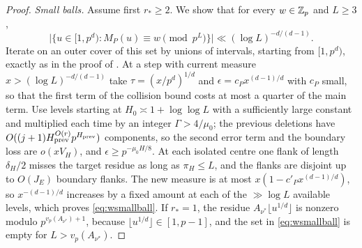 \documentclass[11pt]{article}
\begin{document}
\begin{proof}
\emph{Small balls.} Assume first $r_*\ge2$. We show that for every $w\in\mathbb Z_p$ and $L\ge3$,
\begin{equation}\label{eq:wsmallball}
\bigl|\{u\in[1,p^d):M_P(u)\equiv w\pmod{p^L}\}\bigr|\ll(\log L)^{-d/(d-1)} .
\end{equation}
Iterate  on an outer cover of this set by unions of intervals, starting from $[1,p^d)$, exactly as in
the proof of . At a step with current measure $x>(\log L)^{-d/(d-1)}$ take
$\tau=(x/p^d)^{1/d}$ and $\epsilon=c_Px^{(d-1)/d}$ with $c_P$ small, so that the first term of the collision bound
costs at most a quarter of the main term. Use levels starting at $H_0\asymp1+\log\log L$ with a sufficiently large
constant and multiplied each time by an integer $\Gamma>4/\mu_0$; the previous deletions have
$O((j+1)H_{\rm prev}^{O(r)}p^{H_{\rm prev}})$ components, so the second error term and the boundary loss are $o(xV_H)$, and
$\epsilon\ge p^{-\mu_0H/8}$. At each isolated centre one flank of length $\delta_H/2$ misses the target residue as long as
$\pi_H\le L$, and the flanks are disjoint up to $O(J_E)$ boundary flanks. The new measure is at most
$x(1-c'_Px^{(d-1)/d})$, so $x^{-(d-1)/d}$ increases by a fixed amount at each of the $\gg\log L$ available levels, which
proves \eqref{eq:wsmallball}. If $r_*=1$, the residue $A_{\nu^*}\lfloor u^{1/d}\rfloor$ is nonzero modulo
$p^{v_p(A_{\nu^*})+1}$, because $\lfloor u^{1/d}\rfloor\in[1,p-1]$, and the set in \eqref{eq:wsmallball} is empty for
$L>v_p(A_{\nu^*})$.


\end{proof}
\end{document}
